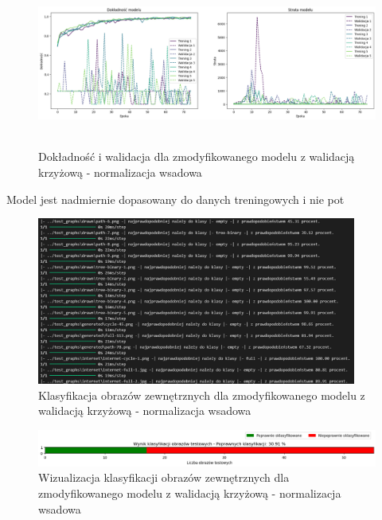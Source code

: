 \begin{figure}[ht]
	\centering
	\includegraphics[height=5.5cm]{resources/tests/images/v4/crossvalid_2_img.png}
	\caption{Dokładność i walidacja dla zmodyfikowanego modelu z walidacją krzyżową - normalizacja wsadowa}
	\label{Fig:tests-cv-2a}
\end{figure}
\FloatBarrier

Model jest nadmiernie dopasowany do danych treningowych i nie pot

\begin{figure}[ht]
	\centering
	\includegraphics[height=5.5cm]{resources/tests/images/v4/crossvalid_2_txt.png}
	\caption{Klasyfikacja obrazów zewnętrznych dla zmodyfikowanego modelu z walidacją krzyżową - normalizacja wsadowa}
	\label{Fig:tests-cv-2b}
\end{figure}
\FloatBarrier

\begin{figure}[ht]
	\centering
	\includegraphics[width=14cm]{resources/tests/images/v4/crossvalid_2_bar.png}
	\caption{Wizualizacja klasyfikacji obrazów zewnętrznych dla zmodyfikowanego modelu z walidacją krzyżową - normalizacja wsadowa}
	\label{Fig:tests-cv-2c}
\end{figure}
\FloatBarrier

